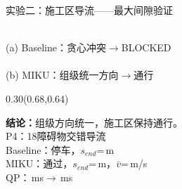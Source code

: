 \documentclass[aspectratio=169,10pt,fontset=none]{ctexbeamer}
\begin{document}
\begin{frame}{实验二：施工区导流——最大间隙验证}
\vspace{-0.4em}

\begin{center}
  \resizebox{0.38\paperwidth}{!}{}\\[-3pt]
  {\footnotesize (a) Baseline：贪心冲突$\to$BLOCKED}\\[1pt]
  \resizebox{0.38\paperwidth}{!}{}\\[-3pt]
  {\footnotesize (b) MIKU：组级统一方向$\to$通行}
\end{center}

\begin{textblock*}{0.30\paperwidth}(0.68\paperwidth,0.64\paperheight)
  \begin{tcolorbox}[slideMetricCard,title=关键指标]
    \scriptsize\raggedright
    \textbf{结论：}组级方向统一，施工区保持通行。\\
    P4：18障碍物交错导流\\
    Baseline：停车，$s_{end}$=\MFourBaselineSEnd\,m\\
    MIKU：通过，$s_{end}$=\MFourMikuSEnd\,m，$\bar{v}$=\MFourMikuAvgV\,m/s\\
    QP：\MFourBaselineQpTotal\,ms$\to$\MFourMikuQpTotal\,ms
  \end{tcolorbox}
\end{textblock*}

\end{frame}
\end{document}
